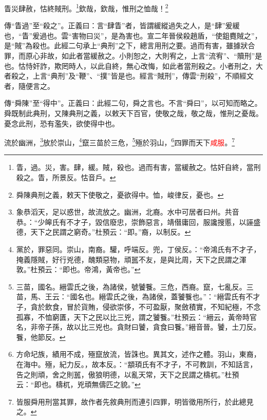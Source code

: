 眚災肆赦，怙終賊刑。\footnote{眚，過。災，害。肆，緩。賊，殺也。過而有害，當緩赦之。怙奸自終，當刑殺之。眚，所景反。怙音戶。}欽哉，欽哉，惟刑之恤哉！\footnote{舜陳典刑之義，敕天下使敬之，憂欲得中。恤，峻律反，憂也。}

{\noindent\zhuan{}\fzbyks 傳“眚過”至“殺之”。正義曰：言“肆眚”者，皆謂緩縱過失之人，是“肆”爰緩也，“眚”爰過也。雲“害物曰災”，是為害也。宣二年晉侯殺趙盾，“使鉏麑賊之”，是“賊”為殺也。此經二句承上“典刑”之下，總言用刑之要。過而有害，雖據狀合罪，而原心非故，如此者當緩赦之。小則恕之，大則宥之，上言“流宥”、“贖刑”是也。怙恃奸詐，欺罔時人，以此自終，無心改悔，如此者當刑殺之。小者刑之，大者殺之，上言“典刑”及“鞭”、“撲”皆是也。經言“賊刑”，傳雲“刑殺”，不順經文者，隨便言之。 \par}

{\noindent\zhuan{}\fzbyks 傳“舜陳”至“得中”。正義曰：此經二句，舜之言也。不言“舜曰”，以可知而略之。舜既制此典刑，又陳典刑之義，以敕天下百官，使敬之哉，敬之哉，惟刑之憂哉。憂念此刑，恐有濫失，欲使得中也。 \par}

流於幽洲，\footnote{象恭滔天，足以惑世，故流放之。幽洲，北裔。水中可居者曰州。共音恭。：“少皞氏有不才子，毀信廢忠，崇飾惡言，靖僣庸回，服讒搜慝，以誣盛德，天下之民謂之窮奇。”杜預云：“即。”裔，以制反。}放於崇山，\footnote{黨於，罪惡同。崇山，南裔。驩，呼端反。兜，丁侯反。：“帝鴻氏有不才子，掩義隱賊，好行兇德，醜類惡物，頑嚚不友，是與比周，天下之民謂之渾敦。”杜預云：“即也。帝鴻，黃帝也。”}竄三苗於三危，\footnote{三苗，國名。縉雲氏之後，為諸侯，號饕餮。三危，西裔。竄，七亂反。三苗，馬、王云：“國名也。縉雲氏之後，為諸侯，蓋饕餮也。”：“縉雲氏有不才子，貪於飲食，冒於貨賄，侵欲崇侈，不可盈厭，聚斂積實，不知紀極，不念孤寡，不恤窮匱，天下之民以比三兇，謂之饕餮。”杜預云：“縉云，黃帝時官名，非帝子孫，故以比三兇也。貪財曰饕，貪食曰餮。”縉音晉。饕，土刀反。餮，他節反。}殛於羽山，\footnote{方命圮族，績用不成，殛竄放流，皆誅也。異其文，述作之體。羽山，東裔，在海中。殛，紀力反。，故本反。：“顓頊氏有不才子，不可教訓，不知話言，告之則頑，舍之則嚚，傲狼明德，以亂天常，天下之民謂之檮杌。”杜預云：“即也。檮杌，兇頑無儔匹之貌。”}四罪而天下\textcolor{red}{咸服}。\footnote{皆服舜用刑當其罪，故作者先敘典刑而連引四罪，明皆徵用所行，於此總見之。}

